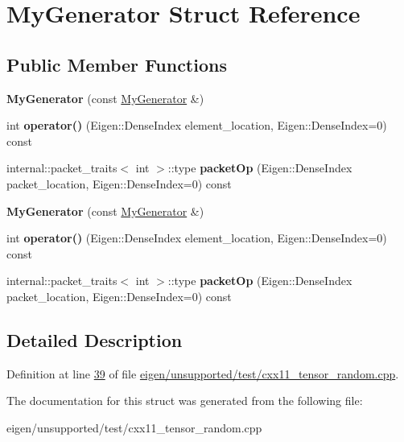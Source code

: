 \hypertarget{struct_my_generator}{}\section{My\+Generator Struct Reference}
\label{struct_my_generator}
\subsection*{Public Member Functions}
\begin{DoxyCompactItemize}
\item 
\mbox{\label{struct_my_generator_a86cdb6e5ebf9f6f155c7c670749af7db}} 
{\bfseries My\+Generator} (const \hyperlink{struct_my_generator}{My\+Generator} \&)
\item 
\mbox{\label{struct_my_generator_ae252b3562b3bdbf6eb065c26fbaaf4dc}} 
int {\bfseries operator()} (Eigen\+::\+Dense\+Index element\+\_\+location, Eigen\+::\+Dense\+Index=0) const
\item 
\mbox{\label{struct_my_generator_a5087b18c8997c98b30ca45fffdc51645}} 
internal\+::packet\+\_\+traits$<$ int $>$\+::type {\bfseries packet\+Op} (Eigen\+::\+Dense\+Index packet\+\_\+location, Eigen\+::\+Dense\+Index=0) const
\item 
\mbox{\label{struct_my_generator_a86cdb6e5ebf9f6f155c7c670749af7db}} 
{\bfseries My\+Generator} (const \hyperlink{struct_my_generator}{My\+Generator} \&)
\item 
\mbox{\label{struct_my_generator_ae252b3562b3bdbf6eb065c26fbaaf4dc}} 
int {\bfseries operator()} (Eigen\+::\+Dense\+Index element\+\_\+location, Eigen\+::\+Dense\+Index=0) const
\item 
\mbox{\label{struct_my_generator_a5087b18c8997c98b30ca45fffdc51645}} 
internal\+::packet\+\_\+traits$<$ int $>$\+::type {\bfseries packet\+Op} (Eigen\+::\+Dense\+Index packet\+\_\+location, Eigen\+::\+Dense\+Index=0) const
\end{DoxyCompactItemize}


\subsection{Detailed Description}


Definition at line \hyperlink{eigen_2unsupported_2test_2cxx11__tensor__random_8cpp_source_l00039}{39} of file \hyperlink{eigen_2unsupported_2test_2cxx11__tensor__random_8cpp_source}{eigen/unsupported/test/cxx11\+\_\+tensor\+\_\+random.\+cpp}.



The documentation for this struct was generated from the following file\+:\begin{DoxyCompactItemize}
\item 
eigen/unsupported/test/cxx11\+\_\+tensor\+\_\+random.\+cpp\end{DoxyCompactItemize}
